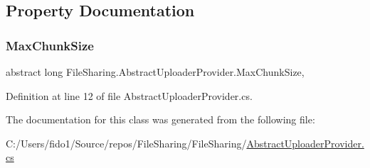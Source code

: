 \subsection{Property Documentation}
\mbox{\label{class_file_sharing_1_1_abstract_uploader_provider_abb54ae14105fa9e2d8e68ae474bd74cf}} 
\subsubsection{\texorpdfstring{Max\+Chunk\+Size}{MaxChunkSize}}
{\footnotesize\ttfamily abstract long File\+Sharing.\+Abstract\+Uploader\+Provider.\+Max\+Chunk\+Size\hspace{0.3cm}{\ttfamily [get]}, {}}



Definition at line 12 of file Abstract\+Uploader\+Provider.\+cs.



The documentation for this class was generated from the following file\+:\begin{DoxyCompactItemize}
\item 
C\+:/\+Users/fido1/\+Source/repos/\+File\+Sharing/\+File\+Sharing/\hyperlink{_abstract_uploader_provider_8cs}{Abstract\+Uploader\+Provider.\+cs}\end{DoxyCompactItemize}
